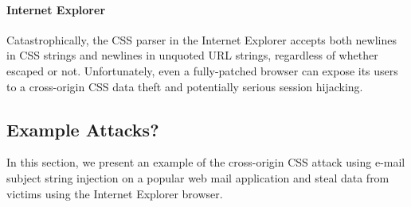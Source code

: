 \documentclass{acm_proc_article-sp}
\begin{document}
\paragraph{Internet Explorer}
Catastrophically, the CSS parser in the Internet Explorer accepts both newlines in CSS strings and newlines in unquoted URL strings, regardless of whether escaped or not. Unfortunately, even a fully-patched browser can expose its users to a cross-origin CSS data theft and potentially serious session hijacking.

\subsection{Example Attacks?}
In this section, we present an example of the cross-origin CSS attack using e-mail subject string injection on a popular web mail application and steal data from victims using the Internet Explorer browser.
\end{document}
